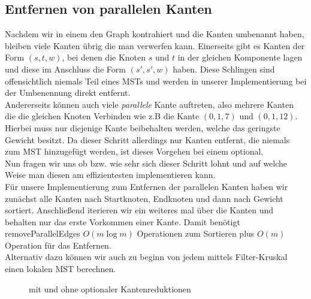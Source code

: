 \subsection{Entfernen von parallelen Kanten}\label{remove-Section}
Nachdem wir in einem \boruvkaStep den Graph kontrahiert und die Kanten umbenannt haben, bleiben viele Kanten übrig die man verwerfen kann. Einerseits gibt es Kanten der Form $(s,t,w)$, bei denen die Knoten $s$ und $t$ in der gleichen Komponente lagen und diese im Anschluss die Form $(s',s',w)$ haben. Diese Schlingen sind offensichtlich niemals Teil eines MSTs und werden in unserer Implementierung bei der Umbenennung direkt entfernt.\\
Andererseits können auch viele \emph{parallele} Kante auftreten, also mehrere Kanten die die gleichen Knoten Verbinden wie z.B die Kante $(0,1,7)$ und $(0,1,12)$. Hierbei muss nur diejenige Kante beibehalten werden, welche das geringste Gewicht besitzt. Da dieser Schritt allerdings nur Kanten entfernt, die niemals zum MST hinzugefügt werden, ist dieses Vorgehen bei einem \boruvkaStep optional. \\
Nun fragen wir uns ob bzw. wie sehr sich dieser Schritt lohnt und auf welche Weise man diesen am effizientesten implementieren kann.\\
Für unsere Implementierung zum Entfernen der parallelen Kanten haben wir zunächst alle Kanten nach Startknoten, Endknoten und dann nach Gewicht sortiert. Anschließend iterieren wir ein weiteres mal über die Kanten und behalten nur das erste Vorkommen einer Kante. Damit benötigt removeParallelEdges $O(m\log m)$ Operationen zum Sortieren plus $O(m)$ Operation für das Entfernen.\\
Alternativ dazu können wir auch zu beginn von jedem \boruvkaStep mittels Filter-Kruskal einen lokalen MST berechnen.\\


\begin{figure}[H]
    \centering
    
    
    
    \caption{\boruvkaAllreduce mit und ohne optionaler Kantenreduktionen}
    \label{RemoveParallel-Img}
\end{figure}

